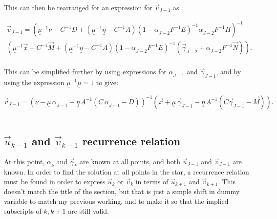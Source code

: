 \documentclass[11pt]{amsart}
\begin{document}
This can then be rearranged for an expression for $\vec{v}_{J-1}$ as

\begin{multline} \label{eq:v_J-1_long}
\vec{v}_{J-1}  =   \left(    \underline{\mu}^{-1} \underline{\nu}   - \underline{C}^{-1} \underline{D}  +  \left(   \underline{\mu}^{-1} \underline{\eta}  - \underline{C}^{-1} \underline{A}  \right)  \left(   1  - \underline{\alpha}_{J-2} \underline{F}^{-1} \underline{E}  \right)^{-1} \underline{\alpha}_{J-2}  \underline{F}^{-1} \underline{H}  \right)^{-1}    \\
\left(   \underline{\mu}^{-1} \vec{x}  -  \underline{C}^{-1} \vec{M}  +   \left(   \underline{\mu}^{-1} \underline{\eta}  - \underline{C}^{-1} \underline{A}  \right)  \left(   1  - \underline{\alpha}_{J-2} \underline{F}^{-1} \underline{E}  \right)^{-1}   \left(    \vec{\gamma}_{J-2}  +  \underline{\alpha}_{J-2} \underline{F}^{-1}  \vec{N}   \right)  \right)  .
\end{multline}
\\
This can be simplified further by using expressions for $\underline{\alpha}_{J-1}$ and $\vec{\gamma}_{J-1}$, and by using the expression $\underline{\mu}^{-1} \underline{\mu} = 1$ to give:

\begin{equation} \label{eq:v_J-1}
\vec{v}_{J-1}  =   \left(    \underline{\nu}   -  \underline{\mu} \, \underline{\alpha}_{J-1}  +  \underline{\eta} \, \underline{A}^{-1} \left( \underline{C} \, \underline{\alpha}_{J-1}  -  \underline{D} \right)  \right)^{-1}    
\left(   \vec{x}  +  \underline{\mu} \, \vec{\gamma}_{J-1}  -   \underline{\eta} \, \underline{A}^{-1} \left(   \underline{C} \vec{\gamma}_{J-1} - \vec{M}   \right)  \right)  .
\end{equation}
\\








\subsection{$\vec{u}_{k-1}$ and $\vec{v}_{k-1}$ recurrence relation}

At this point, $\underline{\alpha}_{k}$ and $\vec{\gamma}_{k}$ are known at all points, and both $\vec{u}_{J-1}$ and $\vec{v}_{J-1}$ are known.  In order to find the solution at all points in the star, a recurrence relation must be found in order to express $\vec{u}_{k}$ or $\vec{v}_{k}$ in terms of $\vec{u}_{k+1}$ and $\vec{v}_{k+1}$.  This doesn't match the title of the section, but that is just a simple shift in dummy variable to match my previous working, and to make it so that the implied subscripts of $k,k+1$ are still valid.
\end{document}
